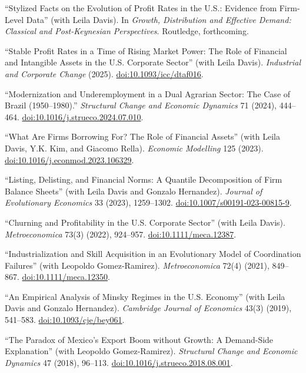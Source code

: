 \documentclass[10pt]{article}
\begin{document}
``Stylized Facts on the Evolution of Profit Rates in the U.S.: Evidence
from Firm-Level Data'' (with Leila Davis). In \textit{Growth,
Distribution and Effective Demand: Classical and Post-Keynesian
Perspectives}. Routledge, forthcoming.

``Stable Profit Rates in a Time of Rising Market Power: The Role of
Financial and Intangible Assets in the U.S. Corporate Sector'' (with
Leila Davis). \textit{Industrial and Corporate Change} (2025).
\href{https://doi.org/10.1093/icc/dtaf016}{doi:10.1093/icc/dtaf016}.

``Modernization and Underemployment in a Dual Agrarian Sector: The Case
of Brazil (1950--1980).'' \textit{Structural Change and Economic
Dynamics} 71 (2024), 444--464.
\href{https://doi.org/10.1016/j.strueco.2024.07.010}
{doi:10.1016/j.strueco.2024.07.010}.

``What Are Firms Borrowing For? The Role of Financial Assets'' (with
Leila Davis, Y.K. Kim, and Giacomo Rella). \textit{Economic Modelling}
125 (2023).
\href{https://doi.org/10.1016/j.econmod.2023.106329}
{doi:10.1016/j.econmod.2023.106329}.

``Listing, Delisting, and Financial Norms: A Quantile Decomposition of
Firm Balance Sheets'' (with Leila Davis and Gonzalo Hernandez).
\textit{Journal of Evolutionary Economics} 33 (2023), 1259--1302.
\href{https://doi.org/10.1007/s00191-023-00815-9}
{doi:10.1007/s00191-023-00815-9}.

``Churning and Profitability in the U.S. Corporate Sector'' (with
Leila Davis). \textit{Metroeconomica} 73(3) (2022), 924--957.
\href{https://doi.org/10.1111/meca.12387}{doi:10.1111/meca.12387}.

``Industrialization and Skill Acquisition in an Evolutionary Model of
Coordination Failures'' (with Leopoldo Gomez-Ramirez).
\textit{Metroeconomica} 72(4) (2021), 849--867.
\href{https://doi.org/10.1111/meca.12350}{doi:10.1111/meca.12350}.

``An Empirical Analysis of Minsky Regimes in the U.S. Economy'' (with
Leila Davis and Gonzalo Hernandez). \textit{Cambridge Journal of
Economics} 43(3) (2019), 541--583.
\href{https://doi.org/10.1093/cje/bey061}{doi:10.1093/cje/bey061}.

``The Paradox of Mexico's Export Boom without Growth: A Demand-Side
Explanation'' (with Leopoldo Gomez-Ramirez). \textit{Structural Change
and Economic Dynamics} 47 (2018), 96--113.
\href{https://doi.org/10.1016/j.strueco.2018.08.001}
{doi:10.1016/j.strueco.2018.08.001}.
\end{document}
